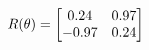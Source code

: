 \documentclass[preview]{standalone}
\begin{document}
\begin{align*}
\special{dvisvgm:raw <g id='unique000'>}R(\theta) = \begin{bmatrix}0.24 & 0.97\\-0.97 & 0.24\end{bmatrix}\special{dvisvgm:raw </g>}
\end{align*}
\end{document}
